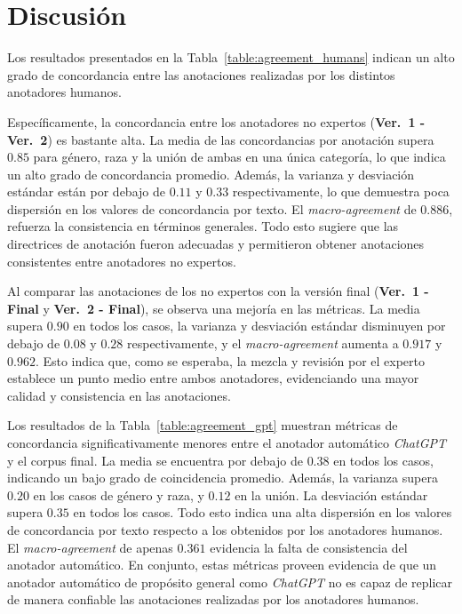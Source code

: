 \section{Discusi\'on}
Los resultados presentados en la Tabla~\ref{table:agreement_humans} indican un alto grado de concordancia entre las 
anotaciones realizadas por los distintos anotadores humanos.

Espec\'ificamente, la concordancia entre los anotadores no expertos (\textbf{Ver.~1 - Ver.~2}) es bastante alta. La
media de las concordancias por anotaci\'on supera $0.85$ para g\'enero, raza y la uni\'on de ambas en una \'unica categor\'ia,
lo que indica un alto grado de concordancia promedio. Adem\'as, la varianza y desviaci\'on est\'andar est\'an por debajo de 
$0.11$ y $0.33$ respectivamente, lo que demuestra poca dispersi\'on en los valores de concordancia por texto. El
\emph{macro-agreement} de $0.886$, refuerza la consistencia en t\'erminos generales. Todo esto sugiere que las directrices 
de anotaci\'on fueron adecuadas y permitieron obtener anotaciones consistentes entre anotadores no expertos.

Al comparar las anotaciones de los no expertos con la versi\'on final (\textbf{Ver.~1 - Final} y \textbf{Ver.~2 - Final}), se
observa una mejor\'ia en las m\'etricas. La media supera $0.90$ en todos los casos, la varianza y desviaci\'on est\'andar
disminuyen por debajo de $0.08$ y $0.28$ respectivamente, y el \emph{macro-agreement} aumenta a $0.917$ y 
$0.962$. Esto indica que, como se esperaba, la mezcla y revisi\'on por el experto establece un 
punto medio entre ambos anotadores, evidenciando una mayor calidad y consistencia en las anotaciones.

Los resultados de la Tabla~\ref{table:agreement_gpt} muestran m\'etricas de concordancia significativamente menores entre 
el anotador autom\'atico \emph{ChatGPT} y el corpus final. La media se encuentra por debajo de $0.38$ en todos los casos,
indicando un bajo grado de coincidencia promedio. Adem\'as, la varianza supera $0.20$ en los casos de g\'enero y raza, y 
$0.12$ en la uni\'on. La desviaci\'on est\'andar supera $0.35$ en todos los casos. Todo esto indica una alta 
dispersi\'on en los valores de concordancia por texto respecto a los obtenidos por los anotadores humanos. El 
\emph{macro-agreement} de apenas $0.361$ evidencia la falta de consistencia del anotador autom\'atico. En conjunto, estas
m\'etricas proveen evidencia de que un anotador autom\'atico de prop\'osito general como \emph{ChatGPT} no es capaz de replicar
de manera confiable las anotaciones realizadas por los anotadores humanos.  

